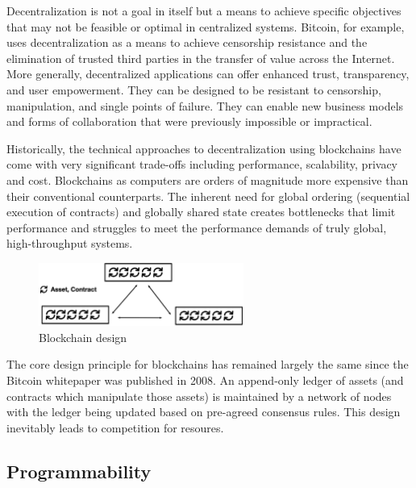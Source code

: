 \documentclass{article}
\begin{document}
Decentralization is not a goal in itself but a means to achieve specific objectives that may not be feasible or optimal in centralized systems. Bitcoin, for example, uses decentralization as a means to achieve censorship resistance and the elimination of trusted third parties in the transfer of value across the Internet. More generally, decentralized applications can offer enhanced trust, transparency, and user empowerment. They can be designed to be resistant to censorship, manipulation, and single points of failure. They can enable new business models and forms of collaboration that were previously impossible or impractical.

Historically, the technical approaches to decentralization using blockchains have come with very significant trade-offs including performance, scalability, privacy and cost. Blockchains as computers are orders of magnitude more expensive than their conventional counterparts. The inherent need for global ordering (sequential execution of contracts) and globally shared state creates bottlenecks that limit performance and struggles to meet the performance demands of truly global, high-throughput systems.

\begin{figure}[H]
    \centering
    \includegraphics[width=0.6\textwidth]{Legacy.png}
    \caption{Blockchain design}
    \label{fig:legacy}
\end{figure}

The core design principle for blockchains has remained largely the same since the Bitcoin whitepaper was published in 2008. An append-only ledger of assets (and contracts which manipulate those assets) is maintained by a network of nodes with the ledger being updated based on pre-agreed consensus rules. This design inevitably leads to competition for resoures.

\subsection{Programmability}
\end{document}
